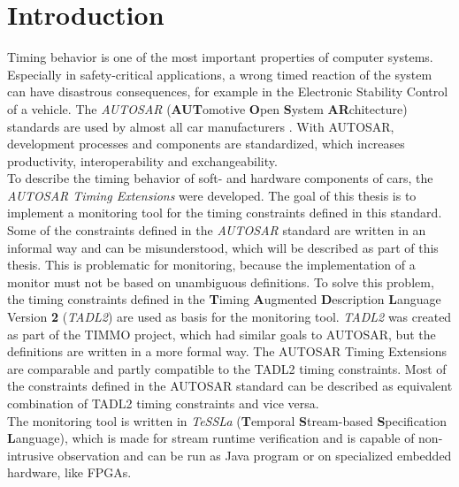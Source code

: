 
\chapter{Introduction}

	Timing behavior is one of the most important properties of computer systems. Especially in safety-critical applications, a wrong timed reaction of the system can have disastrous consequences, for example in the Electronic Stability Control of a vehicle. The \emph{AUTOSAR} (\textbf{AUT}omotive \textbf{O}pen \textbf{S}ystem \textbf{AR}chitecture) standards are used by almost all car manufacturers \cite{AUTOSARpartner}. With AUTOSAR, development processes and components are standardized, which increases productivity, interoperability and exchangeability.\\
	To describe the timing behavior of soft- and hardware components of cars, the \emph{AUTOSAR Timing Extensions} were developed. The goal of this thesis is to implement a monitoring tool for the timing constraints defined in this standard.\\
	Some of the constraints defined in the \emph{AUTOSAR} standard are written in an informal way and can be misunderstood, which will be described as part of this thesis. This is problematic for monitoring, because the implementation of a monitor must not be based on unambiguous definitions. To solve this problem, the timing constraints defined in the \textbf{T}iming \textbf{A}ugmented \textbf{D}escription \textbf{L}anguage Version \textbf{2} (\textit{TADL2}) are used as basis for the monitoring tool. \emph{TADL2} was created as part of the TIMMO project, which had similar goals to AUTOSAR, but the definitions are written in a more formal way. The AUTOSAR Timing Extensions are comparable and partly compatible to the TADL2 timing constraints. Most of the constraints defined in the AUTOSAR standard can be described as equivalent combination of TADL2 timing constraints and vice versa.\\
	The monitoring tool is written in \emph{TeSSLa} (\textbf{T}emporal \textbf{S}tream-based \textbf{S}pecification \textbf{L}anguage), which is made for stream runtime verification and is capable of non-intrusive observation and can be run as Java program or on specialized embedded hardware, like FPGAs.

